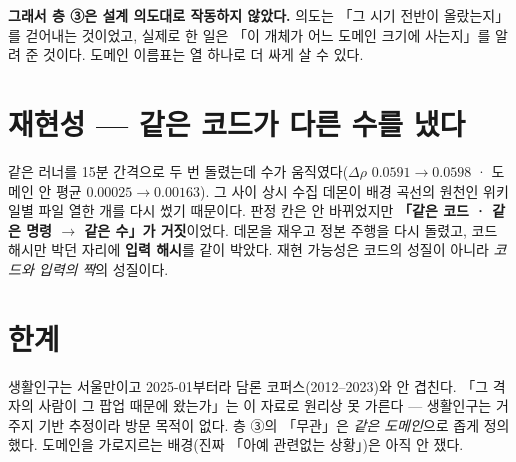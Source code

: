 \documentclass[10pt]{article}
\begin{document}
\textbf{그래서 층 ③은 설계 의도대로 작동하지 않았다.} 의도는 「그 시기 전반이
올랐는지」를 걷어내는 것이었고, 실제로 한 일은 「이 개체가 어느 도메인 크기에
사는지」를 알려 준 것이다. 도메인 이름표는 열 하나로 더 싸게 살 수 있다.

\section{재현성 --- 같은 코드가 다른 수를 냈다}

같은 러너를 15분 간격으로 두 번 돌렸는데 수가 움직였다($\Delta\rho$
$0.0591\to0.0598$ · 도메인 안 평균 $0.00025\to0.00163$). 그 사이 상시 수집
데몬이 배경 곡선의 원천인 위키 일별 파일 열한 개를 다시 썼기 때문이다. 판정 칸은
안 바뀌었지만 \textbf{「같은 코드 · 같은 명령 $\to$ 같은 수」가 거짓}이었다.
데몬을 재우고 정본 주행을 다시 돌렸고, 코드 해시만 박던 자리에 \textbf{입력
해시}를 같이 박았다. 재현 가능성은 코드의 성질이 아니라 \emph{코드와 입력의 짝}의
성질이다.

\section{한계}

생활인구는 서울만이고 2025-01부터라 담론 코퍼스(2012--2023)와 안 겹친다.
「그 격자의 사람이 그 팝업 때문에 왔는가」는 이 자료로 원리상 못 가른다 --- 생활인구는
거주지 기반 추정이라 방문 목적이 없다. 층 ③의 「무관」은 \emph{같은 도메인}으로
좁게 정의했다. 도메인을 가로지르는 배경(진짜 「아예 관련없는 상황」)은 아직 안 쟀다.
\end{document}
